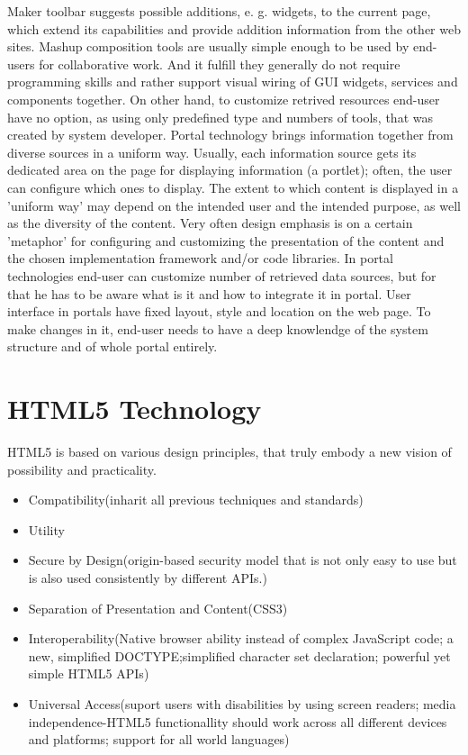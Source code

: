 Maker toolbar suggests possible additions, e. g. widgets, to the current page, which
extend its capabilities and provide addition information from the other web sites. Mashup composition tools are usually simple enough to be used by end-users for collaborative work. And it fulfill they generally do not require programming skills and rather support visual wiring of GUI widgets, services and components together. On other hand, to customize retrived resources end-user have no option, as using only predefined type and numbers of tools, that was created by system developer.
\newline
Portal technology brings information together from diverse sources in a uniform way. Usually, each information source gets its dedicated area on the page for displaying information (a portlet); often, the user can configure which ones to display. The extent to which content is displayed in a 'uniform way' may depend on the intended user and the intended purpose, as well as the diversity of the content. Very often design emphasis is on a certain 'metaphor' for configuring and customizing the presentation of the content and the chosen implementation framework and/or code libraries\cite{pautasso2008restful,seong2006usability}. In portal technologies end-user can customize number of retrieved data sources, but for that he has to be aware what is it and how to integrate it in portal. User interface in portals have fixed layout, style and location on the web page. To make changes in it, end-user needs to have a deep knowlendge of the system structure and of whole portal entirely.

\section{HTML5 Technology}
HTML5 is based on various design principles, that truly embody a new vision of possibility and practicality\cite{hickson2011html5}.
\begin{itemize}
\item Compatibility(inharit all previous techniques and standards)
\item Utility
\item Secure by Design(origin-based security model that is not only easy to use but is also used consistently by different APIs.)
\item Separation of Presentation and Content(CSS3)
\item Interoperability(Native browser ability instead of complex JavaScript code; a new, simplified DOCTYPE;simplified character set declaration; powerful yet simple HTML5 APIs)
\item Universal Access(suport users with disabilities by using screen readers; media independence-HTML5 functionallity should work across all different devices and platforms; support for all world languages)
\end{itemize}

